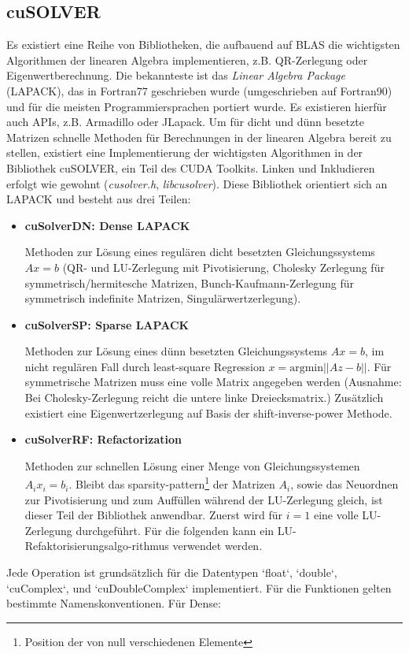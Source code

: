 		\subsection{cuSOLVER}
		Es existiert eine Reihe von Bibliotheken, die aufbauend auf BLAS die wichtigsten Algorithmen der linearen Algebra implementieren, z.B. QR-Zerlegung oder Eigenwertberechnung. Die bekannteste ist das \textit{Linear Algebra Package} (LAPACK), das in Fortran77 geschrieben wurde (umgeschrieben auf Fortran90) und für die meisten Programmiersprachen portiert wurde. Es existieren hierfür auch \Glspl{API}, z.B. Armadillo oder JLapack.
		Um für dicht und dünn besetzte Matrizen schnelle Methoden für Berechnungen in der linearen Algebra bereit zu stellen, existiert eine Implementierung der wichtigsten Algorithmen in der Bibliothek cuSOLVER, ein Teil des CUDA Toolkits. Linken und Inkludieren erfolgt wie gewohnt (\textit{cusolver.h}, \textit{libcusolver}). Diese Bibliothek orientiert sich an LAPACK und besteht aus drei Teilen:
		\begin{itemize}
		    \item \textbf{cuSolverDN: Dense LAPACK} 
		
		    Methoden zur Lösung eines regulären dicht besetzten Gleichungssystems $Ax = b$ (QR- und LU-Zerlegung mit Pivotisierung, Cholesky Zerlegung für symmetrisch/hermitesche Matrizen, Bunch-Kaufmann-Zerlegung für symmetrisch indefinite Matrizen, Singulärwertzerlegung).

		    \newpage
		    
	        	\item \textbf{cuSolverSP: Sparse LAPACK}
		
		    Methoden zur Lösung eines dünn besetzten Gleichungssystems $Ax = b$, im nicht regulären Fall durch least-square Regression $x = \text{argmin}||Az-b||$. Für symmetrische Matrizen muss eine volle Matrix angegeben werden (Ausnahme: Bei Cholesky-Zerlegung reicht die untere linke Dreiecksmatrix.) Zusätzlich existiert eine Eigenwertzerlegung auf Basis der shift-inverse-power Methode. 
		
		    \item \textbf{cuSolverRF: Refactorization}
		
		    Methoden zur schnellen Lösung einer Menge von Gleichungssystemen $A_i x_i = b_i$. Bleibt das sparsity-pattern\footnote{Position der von null verschiedenen Elemente} der Matrizen $A_i$, sowie das Neuordnen zur Pivotisierung und zum Auffüllen während der LU-Zerlegung gleich, ist dieser Teil der Bibliothek anwendbar. Zuerst wird für $i=1$ eine volle LU-Zerlegung durchgeführt. Für die folgenden kann ein LU-Refaktorisierungsalgo-rithmus verwendet werden.	
		\end{itemize}
		Jede Operation ist grundsätzlich für die Datentypen \li`float`, \li`double`, \li`cuComplex`, und \li`cuDoubleComplex` implementiert. Für die Funktionen gelten bestimmte Namenskonventionen. Für Dense:
		
